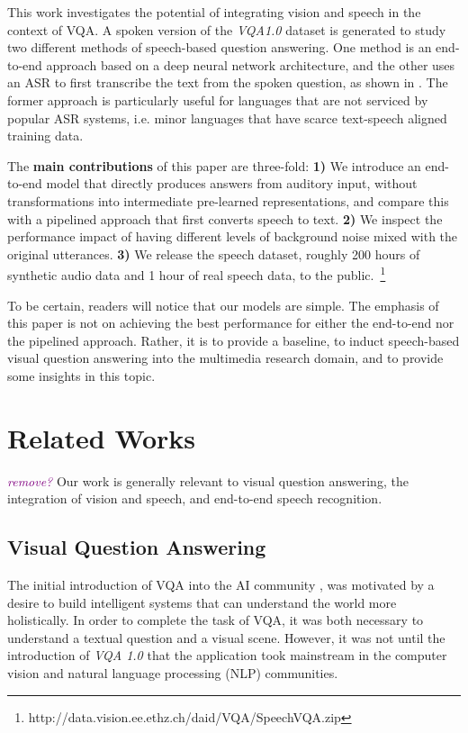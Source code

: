 \documentclass[letterpaper]{article} %
\newcommand{\tz}[1]{\textcolor{purple}{\textit{#1}}}
\begin{document}
This work investigates the potential of integrating vision and speech in the context of VQA. A spoken version of the \textit{VQA1.0} dataset is generated to study two different methods of speech-based question answering. One method is an end-to-end approach based on a deep neural network architecture, and the other uses an ASR to first transcribe the text from the spoken question, as shown in . The former approach is particularly useful for languages that are not serviced by popular ASR systems, i.e. minor languages that have scarce text-speech aligned training data.

The \textbf{main contributions} of this paper are three-fold: \textbf{1)} We introduce an end-to-end model that directly produces answers from auditory input, without transformations into intermediate pre-learned representations, and compare this with a pipelined approach that first converts speech to text. \textbf{2)} We inspect the performance impact of having different levels of background noise mixed with the original utterances. \textbf{3)} We release the speech dataset, roughly 200 hours of synthetic audio data and 1 hour of real speech data, to the public.~\footnote{http://data.vision.ee.ethz.ch/daid/VQA/SpeechVQA.zip}

To be certain, readers will notice that our models are simple. The emphasis of this paper is not on achieving the best performance for either the end-to-end nor the pipelined approach. Rather, it is to provide a baseline, to induct speech-based visual question answering into the multimedia research domain, and to provide some insights in this topic.

\section{Related Works}
\tz{remove?}
Our work is generally relevant to visual question answering, the integration of vision and speech, and end-to-end speech recognition.

\subsection{Visual Question Answering}
The initial introduction of VQA into the AI community \cite{realtime:vqa}, \cite{daquar} was motivated by a desire to build intelligent systems that can understand the world more holistically. In order to complete the task of VQA, it was both necessary to understand a textual question and a visual scene. However, it was not until the introduction of \textit{VQA 1.0} \cite{VQA} that the application took mainstream in the computer vision and natural language processing (NLP) communities.
\end{document}

